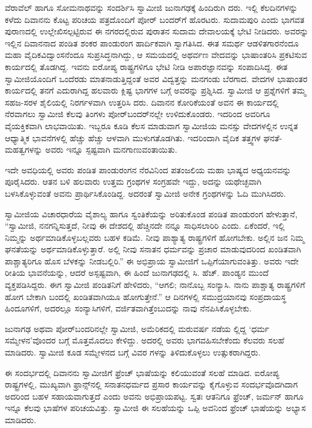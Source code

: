 ವೆರಾವೆಲ್ ಹಾಗೂ ಸೋಮನಾಥವನ್ನು ಸಂದರ್ಶಿಸಿ ಸ್ವಾಮೀಜಿ ಜುನಾಗಢಕ್ಕೆ ಹಿಂದಿರುಗಿ ದರು. ಇಲ್ಲಿ ಕೆಲದಿನಗಳನ್ನು ಕಳೆದು ದಿವಾನನು ಕೊಟ್ಟ ಪರಿಚಯ ಪತ್ರದೊಂದಿಗೆ ಪೋರ್ ಬಂದರ್​ಗೆ ಹೊರಟರು. ಸುದಾಮಪುರಿ ಎಂದು ಭಾಗವತ ಪುರಾಣದಲ್ಲಿ ಉಲ್ಲೇಖಿಸಲ್ಪಟ್ಟಿರುವ ಈ ನಗರದಲ್ಲಿರುವ ಪುರಾತನ ಸುದಾಮ ದೇವಾಲಯಕ್ಕೆ ಭೇಟಿ ನೀಡಿದರು. ಅವರನ್ನು ಇಲ್ಲಿನ ದಿವಾನನಾದ ಪಂಡಿತ ಶಂಕರ ಪಾಂಡುರಂಗ ಹಾರ್ದಿಕವಾಗಿ ಸ್ವಾಗತಿಸಿದ. ಈತ ಸಮರ್ಥ ಆಡಳಿತಗಾರನೆಂದೂ ಮಹಾ ವೈದಿಕವಿದ್ವಾಂಸನೆಂದೂ ಸುಪ್ರಸಿದ್ಧನಾಗಿದ್ದು, ಆ ಸಮಯದಲ್ಲಿ ಅಥರ್ವಣ ವೇದವನ್ನು ಭಾಷಾಂತರಿಸಿ ಪ್ರಕಟಿಸುವ ಕಾರ್ಯದಲ್ಲಿ ತೊಡಗಿದ್ದ. ಇವನು ಐರೋಪ್ಯ ರಾಷ್ಟ್ರಗಳಿಗೂ ಭೇಟಿ ನೀಡಿ ಅಪಾರಜ್ಞಾನವನ್ನು ಸಂಪಾದಿಸಿದ್ದ. ಈತ ಸ್ವಾಮೀಜಿಯೊಂದಿಗೆ ಒಂದೆರಡು ಮಾತನಾಡುತ್ತಿದ್ದಂತೆ ಅವರ ವಿದ್ವತ್ತನ್ನು ಮನಗಂಡು ಬೆರಗಾದ. ವೇದಗಳ ಭಾಷಾಂತರ ಕಾರ್ಯದಲ್ಲಿ ತನಗೆ ಎದುರಾಗಿದ್ದ ಹಲವಾರು ಕ್ಲಿಷ್ಟ ಭಾಗಗಳ ಬಗ್ಗೆ ಅವರನ್ನು ಪ್ರಶ್ನಿಸಿದ. ಸ್ವಾಮೀಜಿ ಆ ಪ್ರಶ್ನೆಗಳಿಗೆ ತಮ್ಮ ಸಹಜ-ಸರಳ ಶೈಲಿಯಲ್ಲಿ ನಿರರ್ಗಳವಾಗಿ ಉತ್ತರಿಸಿ ದರು. ದಿವಾನನ ಕೋರಿಕೆಯಂತೆ ಅವನ ಈ ಕಾರ್ಯದಲ್ಲಿ ನೆರವಾಗಲು ಸ್ವಾಮೀಜಿ ಕೆಲವು ತಿಂಗಳು ಪೋರ್​ಬಂದರ್​ನಲ್ಲೇ ಉಳಿದುಕೊಂಡರು. ಇದರಿಂದ ಅವರಿಗೂ ವೈಯಕ್ತಿಕವಾಗಿ ಲಾಭವಾಯಿತು. ಇಬ್ಬರೂ ಕೂಡಿ ಕೆಲಸ ಮಾಡುವಾಗ ಸ್ವಾಮೀಜಿಯ ಮನಸ್ಸು ವೇದಗಳಲ್ಲಿನ ಉನ್ನತ ಆಧ್ಯಾತ್ಮಿಕ ಭಾವನೆಗಳಲ್ಲಿ ಹೆಚ್ಚು ಹೆಚ್ಚು ಆಳವಾಗಿ ಮುಳುಗತೊಡಗಿತು. ಇದರಿಂದಾಗಿ ವೈದಿಕ ತತ್ತ್ವಗಳ ಘನತೆ-ಮಹತ್ವಗಳನ್ನು ಅವರು ಇನ್ನೂ ಸ್ಪಷ್ಟವಾಗಿ ಮನಗಾಣುವಂತಾಯಿತು.

ಇದೇ ಅವಧಿಯಲ್ಲಿ ಅವರು ಪಂಡಿತ ಪಾಂಡುರಂಗನ ನೆರವಿನಿಂದ ಪತಂಜಲಿಯ ಮಹಾ ಭಾಷ್ಯದ ಅಧ್ಯಯನವನ್ನು ಪೂರೈಸಿದರು. ಆತನ ಬಳಿ ಹಲವಾರು ಉತ್ತಮ ಗ್ರಂಥಗಳ ಸಂಗ್ರಹವೇ ಇದ್ದು, ಅದನ್ನು ಯಥೇಚ್ಛವಾಗಿ ಬಳಸಿಕೊಳ್ಳುವಂತೆ ಅವನು ಪ್ರಾರ್ಥಿಸಿಕೊಂಡಿದ್ದ. ಅದರಂತೆ ಸ್ವಾಮೀಜಿ ಅನೇಕ ಗ್ರಂಥಗಳನ್ನು ಓದಿ ಮುಗಿಸಿದರು.

ಸ್ವಾಮೀಜಿಯ ವಿಚಾರಧಾರೆಯ ವೈಶಾಲ್ಯ ಹಾಗೂ ಸ್ವಂತಿಕೆಯನ್ನು ಅರಿತುಕೊಂಡ ಪಂಡಿತ ಪಾಂಡುರಂಗ ಹೇಳುತ್ತಾನೆ, “ಸ್ವಾಮೀಜಿ, ನನಗನ್ನಿಸುತ್ತದೆ, ನೀವು ಈ ದೇಶದಲ್ಲಿ ಹೆಚ್ಚಿನದೇ ನನ್ನೂ ಸಾಧಿಸಲಾರಿರಿ ಎಂದು. ಏಕೆಂದರೆ, ಇಲ್ಲಿ ನಿಮ್ಮನ್ನು ಅರ್ಥಮಾಡಿಕೊಳ್ಳಬಲ್ಲವರು ಬಹಳ ಕಡಿಮೆ. ನೀವು ಪಾಶ್ಯಾತ್ಯ ರಾಷ್ಟ್ರಗಳಿಗೆ ಹೋಗಬೇಕು. ಅಲ್ಲಿನ ಜನ ನಿಮ್ಮ ಘನತೆಯನ್ನು ಅರ್ಥಮಾಡಿಕೊಳ್ಳುತ್ತಾರೆ. ಅಲ್ಲಿ ನೀವು ಸನಾತನ ಧರ್ಮವನ್ನು ಪ್ರಚಾರ ಮಾಡುವುದರಿಂದ ಖಂಡಿತವಾಗಿ ಪಾಶ್ಚಾತ್ಯರಿಗೂ ಹೊಸ ಬೆಳಕನ್ನು ನೀಡಬಲ್ಲಿರಿ.” ಈ ಅಭಿಪ್ರಾಯ ಸ್ವಾಮೀಜಿಗೆ ಒಪ್ಪಿಗೆಯಾಗುವಂತಿತ್ತು. ಅವರು ಇದೇ ರೀತಿಯ ಭಾವನೆಯನ್ನು, ಆದರೆ ಅಸ್ಪಷ್ಟವಾಗಿ, ಈ ಹಿಂದೆ ಜುನಾಗಢದಲ್ಲಿ ಸಿ. ಹೆಚ್. ಪಾಂಡ್ಯನ ಮುಂದೆ ವ್ಯಕ್ತಪಡಿಸಿದ್ದರು. ಈಗ ಸ್ವಾಮೀಜಿ ಪಂಡಿತನಿಗೆ ಹೇಳಿದರು, “ಆಗಲಿ; ನಾನೊಬ್ಬ ಸಂನ್ಯಾಸಿ. ನಾನು ಪಾಶ್ಚಾತ್ಯ ರಾಷ್ಟ್ರಗಳಿಗೆ ಹೋಗ ಬೇಕಾಗಿ ಬಂದಲ್ಲಿ ಖಂಡಿತವಾಗಿಯೂ ಹೋಗುತ್ತೇನೆ.” ಆ ದಿನಗಳಲ್ಲಿ ಸಮುದ್ರಯಾನವು ಸಂಪ್ರದಾಯಸ್ಥ ಹಿಂದೂಗಳಿಗೆ, ಅದರಲ್ಲೂ ಸಂನ್ಯಾಸಿಗಳಿಗೆ, ವರ್ಜಿತವಾಗಿತ್ತೆಂಬುದನ್ನು ನಾವು ನೆನಪಿಸಿಕೊಳ್ಳಬೇಕು.

ಜುನಾಗಢ ಅಥವಾ ಪೋರ್​ಬಂದರಿನಲ್ಲೇ ಸ್ವಾಮೀಜಿ, ಅಮೆರಿಕದಲ್ಲಿ ಮರುವರ್ಷ ನಡೆಯ ಲ್ಲಿದ್ದ ‘ಧರ್ಮ ಸಮ್ಮೇಳನ’ವೊಂದರ ಬಗ್ಗೆ ಮೊತ್ತಮೊದಲು ಕೇಳಿದ್ದು. ಅದರಲ್ಲಿ ಅವರು ಭಾಗವಹಿಸಬೇಕೆಂದು ಕೆಲವರು ಸಲಹೆ ಮಾಡಿದರು. ಸ್ವಾಮೀಜಿ ಕೂಡ ಸಮ್ಮೇಳನದ ಬಗ್ಗೆ ವಿವರ ಗಳನ್ನು ತಿಳಿದುಕೊಳ್ಳಲು ಉತ್ಸುಕರಾಗಿದ್ದರು.

ಈ ಸಂದರ್ಭದಲ್ಲಿ ದಿವಾನನು ಸ್ವಾಮೀಜಿಗೆ ಫ್ರೆಂಚ್ ಭಾಷೆಯನ್ನು ಕಲಿಯುವಂತೆ ಸಲಹೆ ಮಾಡಿದ. ಐರೋಪ್ಯ ರಾಷ್ಟ್ರಗಳಲ್ಲಿ, ಮುಖ್ಯವಾಗಿ ಫ್ರಾನ್ಸ್​ನಲ್ಲಿ ಸನಾತನಧರ್ಮದ ಪ್ರಸಾರ ಕಾರ್ಯವನ್ನು ಕೈಗೊಳ್ಳುವ ಸಂದರ್ಭವೊದಗಿದಾಗ ಅದರಿಂದ ಬಹಳ ಸಹಾಯವಾಗುತ್ತದೆ ಎಂದು ಅವನು ಅಭಿಪ್ರಾಯಪಟ್ಟ. ಸ್ವತಃ ಆತನಿಗೂ ಫ್ರೆಂಚ್, ಜರ್ಮನ್ ಹಾಗೂ ಇನ್ನೂ ಕೆಲವು ಭಾಷೆಗಳ ಪರಿಚಯವಿತ್ತು. ಸ್ವಾಮೀಜಿ ಈ ಸಲಹೆಯನ್ನು ಒಪ್ಪಿ ಅವನಿಂದ ಫ್ರೆಂಚ್ ಭಾಷೆಯನ್ನು ಅಭ್ಯಾಸ ಮಾಡಿದರು.

